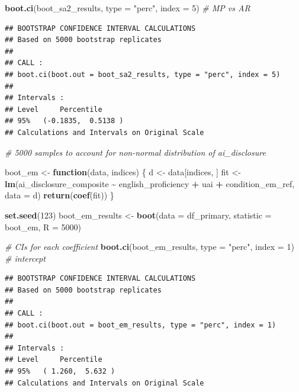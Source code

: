 \documentclass[
]{article}
\newenvironment{Shaded}{\begin{snugshade}}{\end{snugshade}}
\newcommand{\AttributeTok}[1]{\textcolor[rgb]{0.13,0.29,0.53}{#1}}
\newcommand{\CommentTok}[1]{\textcolor[rgb]{0.56,0.35,0.01}{\textit{#1}}}
\newcommand{\ControlFlowTok}[1]{\textcolor[rgb]{0.13,0.29,0.53}{\textbf{#1}}}
\newcommand{\DecValTok}[1]{\textcolor[rgb]{0.00,0.00,0.81}{#1}}
\newcommand{\FunctionTok}[1]{\textcolor[rgb]{0.13,0.29,0.53}{\textbf{#1}}}
\newcommand{\NormalTok}[1]{#1}
\newcommand{\OtherTok}[1]{\textcolor[rgb]{0.56,0.35,0.01}{#1}}
\newcommand{\SpecialCharTok}[1]{\textcolor[rgb]{0.81,0.36,0.00}{\textbf{#1}}}
\newcommand{\StringTok}[1]{\textcolor[rgb]{0.31,0.60,0.02}{#1}}
\begin{document}
\begin{Shaded}
\begin{Highlighting}[]
\FunctionTok{boot.ci}\NormalTok{(boot\_sa2\_results, }\AttributeTok{type =} \StringTok{"perc"}\NormalTok{, }\AttributeTok{index =} \DecValTok{5}\NormalTok{) }\CommentTok{\# MP vs AR}
\end{Highlighting}
\end{Shaded}

\begin{verbatim}
## BOOTSTRAP CONFIDENCE INTERVAL CALCULATIONS
## Based on 5000 bootstrap replicates
## 
## CALL : 
## boot.ci(boot.out = boot_sa2_results, type = "perc", index = 5)
## 
## Intervals : 
## Level     Percentile     
## 95%   (-0.1835,  0.5138 )  
## Calculations and Intervals on Original Scale
\end{verbatim}

\begin{Shaded}
\begin{Highlighting}[]
\CommentTok{\# 5000 samples to account for non{-}normal distribution of ai\_disclosure}

\NormalTok{boot\_em }\OtherTok{\textless{}{-}} \ControlFlowTok{function}\NormalTok{(data, indices) \{}
\NormalTok{  d }\OtherTok{\textless{}{-}}\NormalTok{ data[indices, ]}
\NormalTok{  fit }\OtherTok{\textless{}{-}} \FunctionTok{lm}\NormalTok{(ai\_disclosure\_composite }\SpecialCharTok{\textasciitilde{}}\NormalTok{ english\_proficiency }\SpecialCharTok{+}\NormalTok{ uai }\SpecialCharTok{+}
\NormalTok{              condition\_em\_ref, }\AttributeTok{data =}\NormalTok{ d)}
  \FunctionTok{return}\NormalTok{(}\FunctionTok{coef}\NormalTok{(fit))}
\NormalTok{\}}

\FunctionTok{set.seed}\NormalTok{(}\DecValTok{123}\NormalTok{)}
\NormalTok{boot\_em\_results }\OtherTok{\textless{}{-}} \FunctionTok{boot}\NormalTok{(}\AttributeTok{data =}\NormalTok{ df\_primary, }\AttributeTok{statistic =}\NormalTok{ boot\_em, }\AttributeTok{R =} \DecValTok{5000}\NormalTok{)}

\CommentTok{\# CIs for each coefficient}
\FunctionTok{boot.ci}\NormalTok{(boot\_em\_results, }\AttributeTok{type =} \StringTok{"perc"}\NormalTok{, }\AttributeTok{index =} \DecValTok{1}\NormalTok{) }\CommentTok{\# intercept}
\end{Highlighting}
\end{Shaded}

\begin{verbatim}
## BOOTSTRAP CONFIDENCE INTERVAL CALCULATIONS
## Based on 5000 bootstrap replicates
## 
## CALL : 
## boot.ci(boot.out = boot_em_results, type = "perc", index = 1)
## 
## Intervals : 
## Level     Percentile     
## 95%   ( 1.260,  5.632 )  
## Calculations and Intervals on Original Scale
\end{verbatim}
\end{document}
